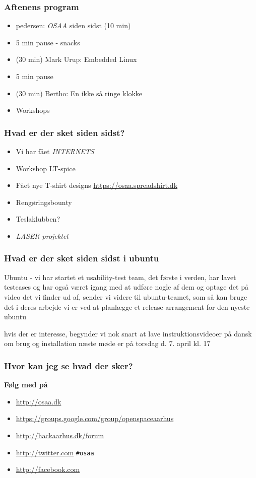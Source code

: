 \documentclass{beamer}
\begin{document}
\begin{frame}
  \frametitle{Aftenens program}
  \begin{itemize}
  \item pedersen: \emph{OSAA} siden sidst (10 min)
  \item 5 min pause - snacks
  \item  (30 min) Mark Urup: Embedded Linux
  \item 5 min pause
  \item  (30 min) Bertho: En ikke så ringe klokke
  \item Workshops

  \end{itemize}
\end{frame}

\begin{frame}
  \frametitle{Hvad er der sket siden sidst?}
  \begin{itemize}

  \item Vi har fået \emph{INTERNETS}
  \item Workshop LT-spice
  \item Fået nye T-shirt designs \url{https://osaa.spreadshirt.dk}
  \item Rengøringsbounty
  \item Teslaklubben?
  \item \emph{LASER projektet}
  \end{itemize}
\end{frame}


\begin{frame}
  \frametitle{Hvad er der sket siden sidst i ubuntu} Ubuntu - vi har
  startet et usability-test team, det første i verden, har lavet
  testcases og har også været igang med at udføre nogle af dem og
  optage det på video det vi finder ud af, sender
  vi videre til ubuntu-teamet, som så kan bruge det i deres arbejde
   vi er ved at planlægge et release-arrangement
  for den nyeste ubuntu

hvis der er interesse, begynder vi nok snart at lave
instruktionsvideoer på dansk om brug og installation næste møde er på
torsdag d. 7. april kl. 17

\end{frame}



\begin{frame}
  \frametitle{Hvor kan jeg se hvad der sker?}
  \textbf{Følg med på}
  \begin{itemize}
  \item  \url{http://osaa.dk}
  \item  \url{https://groups.google.com/group/openspaceaarhus}
  \item  \url{http://hackaarhus.dk/forum}
  \item  \url{http://twitter.com} \texttt{\#osaa}
  \item  \url{http://facebook.com}
  \end{itemize}
\end{frame}
\end{document}
